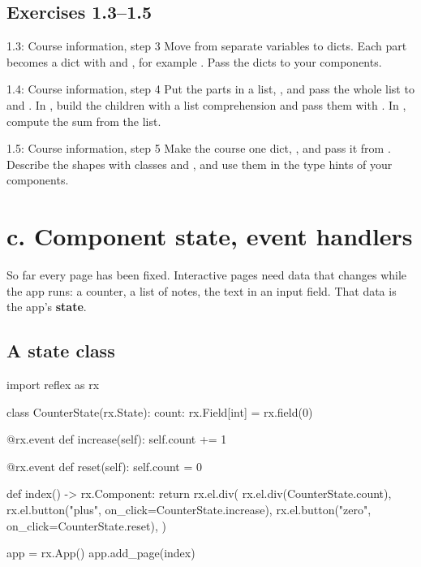 \subsection{Exercises 1.3--1.5}

\begin{exercise}{1.3: Course information, step 3}
Move from separate variables to dicts. Each part becomes a dict with  and , for example . Pass the dicts to your components.
\end{exercise}

\begin{exercise}{1.4: Course information, step 4}
Put the parts in a list, , and pass the whole list to  and . In , build the children with a list comprehension and pass them with \cd{*}. In , compute the sum from the list.
\end{exercise}

\begin{exercise}{1.5: Course information, step 5}
Make the course one dict, , and pass it from . Describe the shapes with  classes  and , and use them in the type hints of your components.
\end{exercise}

\section{c. Component state, event handlers}

So far every page has been fixed. Interactive pages need data that changes while the app runs: a counter, a list of notes, the text in an input field. That data is the app's \textbf{state}.

\subsection{A state class}

\begin{py}
import reflex as rx


class CounterState(rx.State):
	count: rx.Field[int] = rx.field(0)

	@rx.event
	def increase(self):
		self.count += 1

	@rx.event
	def reset(self):
		self.count = 0


def index() -> rx.Component:
	return rx.el.div(
		rx.el.div(CounterState.count),
		rx.el.button("plus", on_click=CounterState.increase),
		rx.el.button("zero", on_click=CounterState.reset),
	)


app = rx.App()
app.add_page(index)
\end{py}


